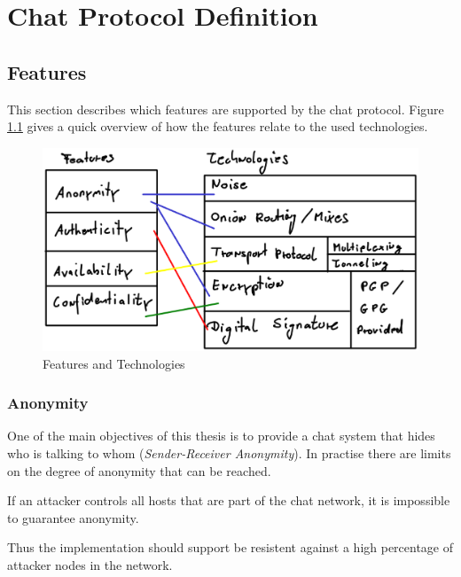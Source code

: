 \chapter{Chat Protocol Definition}
\section{Features}
This section describes which features are supported by the chat protocol.
Figure \ref{features-technologies} gives a quick overview of how the
features relate to the used technologies.
\begin{figure}
    \centering
    \caption{Features and Technologies}
    \label{features-technologies}
    \includegraphics[scale=0.8]{features-technologies.eps}
\end{figure}
\subsection{Anonymity}
One of the main objectives of this thesis is to provide a chat system that
hides who is talking to whom (\textit{Sender-Receiver Anonymity}). 
In practise there are limits on the degree of anonymity that can be reached.


If an attacker controls all hosts that are 
part of the chat network, it is impossible to guarantee anonymity.

Thus the implementation should support be resistent against a high percentage
of attacker nodes in the network.

